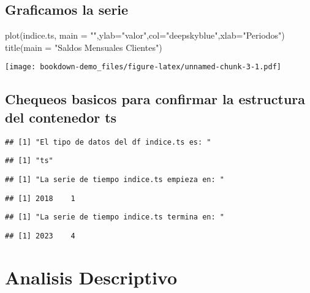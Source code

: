 \documentclass[
]{book}
\newenvironment{Shaded}{\begin{snugshade}}{\end{snugshade}}
\newcommand{\AttributeTok}[1]{\textcolor[rgb]{0.77,0.63,0.00}{#1}}
\newcommand{\FunctionTok}[1]{\textcolor[rgb]{0.00,0.00,0.00}{#1}}
\newcommand{\NormalTok}[1]{#1}
\newcommand{\StringTok}[1]{\textcolor[rgb]{0.31,0.60,0.02}{#1}}
\begin{document}
\hypertarget{graficamos-la-serie}{%
\subsection{Graficamos la serie}\label{graficamos-la-serie}}

\begin{Shaded}
\begin{Highlighting}[]
\FunctionTok{plot}\NormalTok{(indice.ts, }\AttributeTok{main =} \StringTok{""}\NormalTok{,}\AttributeTok{ylab=}\StringTok{"valor"}\NormalTok{,}\AttributeTok{col=}\StringTok{"deepskyblue"}\NormalTok{,}\AttributeTok{xlab=}\StringTok{"Periodos"}\NormalTok{)}
\FunctionTok{title}\NormalTok{(}\AttributeTok{main =} \StringTok{"Saldos Mensuales Clientes"}\NormalTok{)}
\end{Highlighting}
\end{Shaded}

\texttt{[image: bookdown-demo\_files/figure-latex/unnamed-chunk-3-1.pdf]}

\hypertarget{chequeos-basicos-para-confirmar-la-estructura-del-contenedor-ts}{%
\subsection{Chequeos basicos para confirmar la estructura del contenedor ts}\label{chequeos-basicos-para-confirmar-la-estructura-del-contenedor-ts}}

\begin{verbatim}
## [1] "El tipo de datos del df indice.ts es: "
\end{verbatim}

\begin{verbatim}
## [1] "ts"
\end{verbatim}

\begin{verbatim}
## [1] "La serie de tiempo indice.ts empieza en: "
\end{verbatim}

\begin{verbatim}
## [1] 2018    1
\end{verbatim}

\begin{verbatim}
## [1] "La serie de tiempo indice.ts termina en: "
\end{verbatim}

\begin{verbatim}
## [1] 2023    4
\end{verbatim}

\hypertarget{analisis-descriptivo}{%
\section{Analisis Descriptivo}\label{analisis-descriptivo}}
\end{document}
